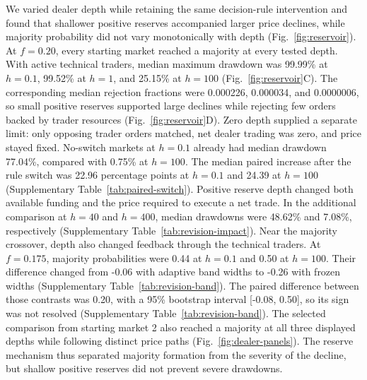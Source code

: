 We varied dealer depth while retaining the same decision-rule intervention
and found that shallower positive reserves accompanied larger price
declines, while majority probability did not vary monotonically with
depth (Fig.~\ref{fig:reservoir}). At $f=0.20$, every starting market
reached a majority at every tested depth. With active technical traders,
median maximum drawdown was 99.99\% at $h=0.1$,
99.52\% at $h=1$, and 25.15\% at $h=100$
(Fig.~\ref{fig:reservoir}C). The corresponding median rejection
fractions were 0.000226, 0.000034, and
0.0000006, so small positive reserves supported large declines
while rejecting few orders backed by trader resources
(Fig.~\ref{fig:reservoir}D). Zero depth supplied a separate limit:
only opposing trader orders matched, net dealer trading was zero, and
price stayed fixed. No-switch markets at $h=0.1$ already had median
drawdown 77.04\%, compared with
0.75\% at $h=100$. The median paired
increase after the rule switch was 22.96
percentage points at $h=0.1$ and 24.39
at $h=100$ (Supplementary Table~\ref{tab:paired-switch}).
Positive reserve depth changed both available
funding and the price required to execute a net trade. In the additional
comparison at $h=40$ and $h=400$, median drawdowns were
48.62\% and
7.08\%, respectively
(Supplementary Table~\ref{tab:revision-impact}).
Near the majority crossover, depth also changed feedback through the
technical traders. At $f=0.175$, majority probabilities were
0.44 at $h=0.1$ and 0.50 at $h=100$.
Their difference changed from -0.06 with
adaptive band widths to -0.26 with frozen widths
(Supplementary Table~\ref{tab:revision-band}). The paired difference
between those contrasts was 0.20, with a 95\%
bootstrap interval [-0.08, 0.50], so its sign was
not resolved (Supplementary Table~\ref{tab:revision-band}). The selected comparison
from starting market 2 also reached a majority at all three
displayed depths while following distinct price paths
(Fig.~\ref{fig:dealer-panels}). The reserve mechanism thus separated
majority formation from the severity of the decline, but shallow positive
reserves did not prevent severe drawdowns.


